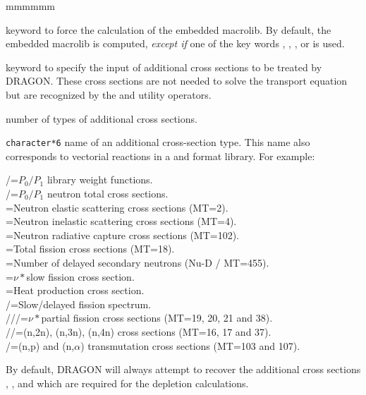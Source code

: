\begin{ListeDeDescription}{mmmmmm}
\item[\moc{MACR}] keyword to force the calculation of the embedded
macrolib. By default, the embedded macrolib is computed, {\sl except if} one of the
key words , , ,  or  is used.

\item[\moc{ADED}] keyword to specify the input of additional cross sections to
be treated by DRAGON. These cross sections are not needed to solve the transport
equation but are recognized by the  and utility operators.

\item[\dusa{nedit}] number of types of additional cross sections.

\item[\dusa{HEDIT}] {\tt character*6} name of an additional
cross-section type. This name also corresponds to vectorial reactions in a
 and
 format library. For example:

/=$P_0/P_1$ library weight functions.\\
/=$P_0/P_1$ neutron total cross sections.\\
=Neutron elastic scattering cross sections (MT=2).\\
=Neutron inelastic scattering cross sections (MT=4).\\
=Neutron radiative capture cross sections (MT=102).\\
=Total fission cross sections (MT=18).\\
=Number of delayed secondary neutrons (Nu-D / MT=455).\\
=$\nu*$slow fission cross section.\\
=Heat production cross section.\\
/=Slow/delayed fission spectrum.\\
///=$\nu*$partial fission cross sections (MT=19, 20, 21 and 38).\\ 
//=(n,2n), (n,3n), (n,4n) cross sections (MT=16, 17 and 37).\\
/=(n,p) and (n,$\alpha$) transmutation cross sections (MT=103 and 107).

By default, DRAGON will always attempt to recover the additional cross sections
, ,  and  which are required for the depletion
calculations. 


\end{ListeDeDescription}
